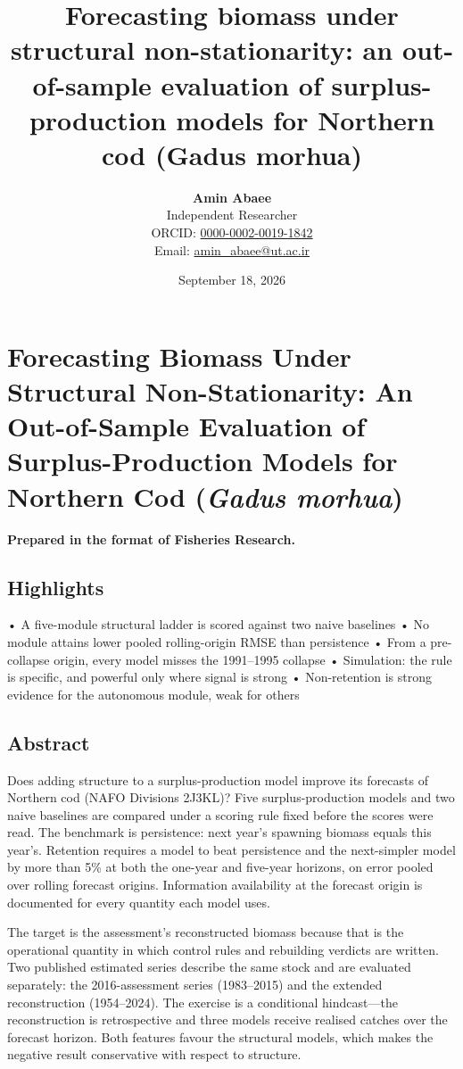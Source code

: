\documentclass[11pt]{article}
\title{Forecasting biomass under structural non-stationarity: an out-of-sample evaluation of surplus-production models for Northern cod (Gadus morhua)}
\author{\textbf{Amin Abaee}\\ Independent Researcher\\[2pt] ORCID: \href{https://orcid.org/0000-0002-0019-1842}{0000-0002-0019-1842}\\ Email: \href{mailto:amin_abaee@ut.ac.ir}{amin_abaee@ut.ac.ir}}
\date{September 18, 2026}
\begin{document}
\maketitle

\section{\texorpdfstring{Forecasting Biomass Under Structural
Non-Stationarity: An Out-of-Sample Evaluation of Surplus-Production
Models for Northern Cod (\emph{Gadus
morhua})}{Forecasting Biomass Under Structural Non-Stationarity: An Out-of-Sample Evaluation of Surplus-Production Models for Northern Cod (Gadus morhua)}}\label{forecasting-biomass-under-structural-non-stationarity-an-out-of-sample-evaluation-of-surplus-production-models-for-northern-cod-gadus-morhua}

\textbf{Prepared in the format of Fisheries Research.}

\subsection{Highlights}\label{highlights}

• A five-module structural ladder is scored against two naive baselines
• No module attains lower pooled rolling-origin RMSE than persistence •
From a pre-collapse origin, every model misses the 1991--1995 collapse •
Simulation: the rule is specific, and powerful only where signal is
strong • Non-retention is strong evidence for the autonomous module,
weak for others

\subsection{Abstract}\label{abstract}

Does adding structure to a surplus-production model improve its
forecasts of Northern cod (NAFO Divisions 2J3KL)? Five
surplus-production models and two naive baselines are compared under a
scoring rule fixed before the scores were read. The benchmark is
persistence: next year's spawning biomass equals this year's. Retention
requires a model to beat persistence and the next-simpler model by more
than 5\% at both the one-year and five-year horizons, on error pooled
over rolling forecast origins. Information availability at the forecast
origin is documented for every quantity each model uses.

The target is the assessment's reconstructed biomass because that is the
operational quantity in which control rules and rebuilding verdicts are
written. Two published estimated series describe the same stock and are
evaluated separately: the 2016-assessment series (1983--2015) and the
extended reconstruction (1954--2024). The exercise is a conditional
hindcast---the reconstruction is retrospective and three models receive
realised catches over the forecast horizon. Both features favour the
structural models, which makes the negative result conservative with
respect to structure.
\end{document}
